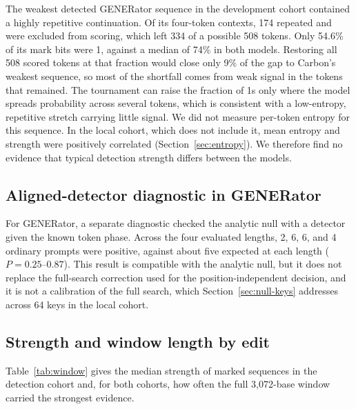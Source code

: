 \documentclass[10pt,twocolumn]{article}
\begin{document}
The weakest detected GENERator sequence in the development cohort contained a highly repetitive
continuation. Of its
four-token contexts, 174 repeated and were excluded from scoring, which left 334 of a possible 508
tokens. Only 54.6\% of its mark bits were 1, against a median of 74\% in both models. Restoring all
508 scored tokens at that fraction would close only 9\% of the gap to Carbon's weakest sequence, so most
of the shortfall comes from weak signal in the tokens that remained. The tournament can raise the
fraction of 1s only where the model spreads probability across several tokens, which is consistent
with a low-entropy, repetitive stretch carrying little signal. We did not measure per-token entropy
for this sequence. In the local cohort, which does not include it, mean entropy and strength were
positively correlated (Section~\ref{sec:entropy}). We therefore find no evidence that typical detection strength differs between the
models.

\subsection{Aligned-detector diagnostic in GENERator}
\label{supp:aligned}

For GENERator, a separate diagnostic checked the analytic null with a detector given the known
token phase. Across the four evaluated lengths, 2, 6, 6, and 4 ordinary prompts were positive,
against about five expected at each length ($P = 0.25$--$0.87$). This result is compatible with
the analytic null, but it does not replace the full-search correction used for the
position-independent decision, and it is not a calibration of the full search,
which Section~\ref{sec:null-keys} addresses across 64 keys in the local cohort.

\subsection{Strength and window length by edit}
\label{supp:window}

Table~\ref{tab:window} gives the median strength of marked sequences in the detection cohort and, for
both cohorts, how often the full 3{,}072-base window carried the strongest evidence.
\end{document}
